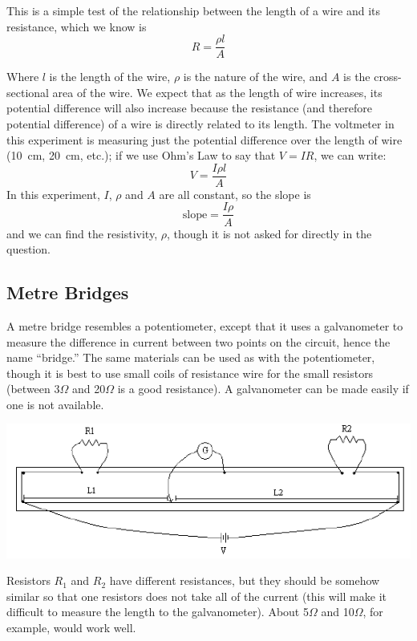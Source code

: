 This is a simple test of the relationship between the length of a wire and its
resistance, which we know is $$R=\frac{\rho l}{A} $$

Where $l$ is the length of the wire, $\rho$ is the nature of the wire, and $A$ is the cross-sectional
area of the wire. We expect that as the length of wire increases, its potential difference
will also increase because the resistance (and therefore potential difference) of a wire is
directly related to its length. The voltmeter in this experiment is measuring just the
potential difference over the length of wire (10~cm, 20~cm, etc.); if we use Ohm’s Law to say that $V = IR$, we can write:\\
$$ V = \frac{I \rho l}{A} $$
In this experiment, $I$, $\rho$ and $A$ are all constant, so the slope is
$$\mathrm{slope} = \frac{I \rho}{A} $$
and we can find the resistivity, $\rho$, though it is not asked for directly in the question.

\subsection{Metre Bridges}

A metre bridge resembles a potentiometer, except that it uses a galvanometer to
measure the difference in current between two points on the circuit, hence the name
``bridge.'' The same materials can be used as with the potentiometer, though it is best to
use small coils of resistance wire for the small resistors (between 3$\Omega$ and 20$\Omega$ is a good resistance). A galvanometer can be made easily if one is not available.

\begin{center}
\includegraphics{./img/meter-bridge-2.png}
\end{center}

Resistors $R_1$ and $R_2$ have different resistances, but they should be somehow similar so
that one resistors does not take all of the current (this will make it difficult to measure the
length to the galvanometer). About 5$\Omega$ and 10$\Omega$, for example, would work well.

